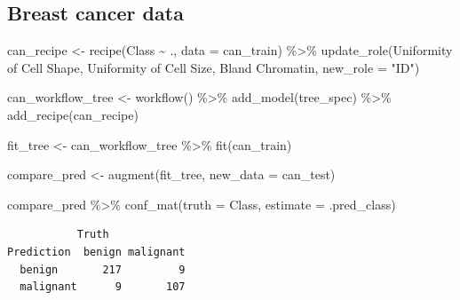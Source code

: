 \documentclass[
  letterpaper,
  DIV=11,
  numbers=noendperiod]{scrreprt}
\newenvironment{Shaded}{\begin{snugshade}}{\end{snugshade}}
\newcommand{\AttributeTok}[1]{\textcolor[rgb]{0.40,0.45,0.13}{#1}}
\newcommand{\FunctionTok}[1]{\textcolor[rgb]{0.28,0.35,0.67}{#1}}
\newcommand{\NormalTok}[1]{\textcolor[rgb]{0.00,0.23,0.31}{#1}}
\newcommand{\OtherTok}[1]{\textcolor[rgb]{0.00,0.23,0.31}{#1}}
\newcommand{\SpecialCharTok}[1]{\textcolor[rgb]{0.37,0.37,0.37}{#1}}
\newcommand{\StringTok}[1]{\textcolor[rgb]{0.13,0.47,0.30}{#1}}
\begin{document}
\hypertarget{breast-cancer-data-1}{%
\subsection{Breast cancer data}\label{breast-cancer-data-1}}

\begin{Shaded}
\begin{Highlighting}[]
\NormalTok{can\_recipe }\OtherTok{\textless{}{-}} 
  \FunctionTok{recipe}\NormalTok{(Class }\SpecialCharTok{\textasciitilde{}}\NormalTok{ ., }\AttributeTok{data =}\NormalTok{ can\_train) }\SpecialCharTok{\%\textgreater{}\%} 
  \FunctionTok{update\_role}\NormalTok{(}\StringTok{\textasciigrave{}}\AttributeTok{Uniformity of Cell Shape}\StringTok{\textasciigrave{}}\NormalTok{,  }\StringTok{\textasciigrave{}}\AttributeTok{Uniformity of Cell Size}\StringTok{\textasciigrave{}}\NormalTok{, }\StringTok{\textasciigrave{}}\AttributeTok{Bland Chromatin}\StringTok{\textasciigrave{}}\NormalTok{, }\AttributeTok{new\_role =} \StringTok{"ID"}\NormalTok{)}
  

\NormalTok{can\_workflow\_tree }\OtherTok{\textless{}{-}} \FunctionTok{workflow}\NormalTok{() }\SpecialCharTok{\%\textgreater{}\%}
  \FunctionTok{add\_model}\NormalTok{(tree\_spec) }\SpecialCharTok{\%\textgreater{}\%}
  \FunctionTok{add\_recipe}\NormalTok{(can\_recipe)}

\NormalTok{fit\_tree }\OtherTok{\textless{}{-}}\NormalTok{ can\_workflow\_tree }\SpecialCharTok{\%\textgreater{}\%} \FunctionTok{fit}\NormalTok{(can\_train)}
\end{Highlighting}
\end{Shaded}

\begin{Shaded}
\begin{Highlighting}[]
\NormalTok{compare\_pred }\OtherTok{\textless{}{-}} \FunctionTok{augment}\NormalTok{(fit\_tree, }\AttributeTok{new\_data =}\NormalTok{ can\_test) }

\NormalTok{compare\_pred }\SpecialCharTok{\%\textgreater{}\%} \FunctionTok{conf\_mat}\NormalTok{(}\AttributeTok{truth =}\NormalTok{ Class, }\AttributeTok{estimate =}\NormalTok{ .pred\_class)}
\end{Highlighting}
\end{Shaded}

\begin{verbatim}
           Truth
Prediction  benign malignant
  benign       217         9
  malignant      9       107
\end{verbatim}
\end{document}
